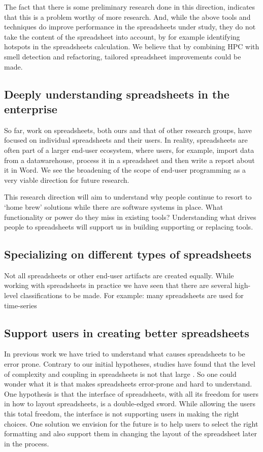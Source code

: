 \documentclass[conference]{IEEEtran}
\begin{document}
The fact that there is some preliminary research done in this direction, indicates that this is a problem worthy of more research. And, while the above tools and techniques do improve performance in the spreadsheets under study, they do not take the content of the spreadsheet into account, by for example identifying hotspots in the spreadsheets calculation. We believe that by combining HPC with smell detection and refactoring, tailored spreadsheet improvements could be made.

\subsection{Deeply understanding spreadsheets in the enterprise}
So far, work on spreadsheets, both ours and that of other research groups, have focused on individual spreadsheets and their users. In reality, spreadsheets are often part of a larger end-user ecosystem, where users, for example, import data from a datawarehouse, process it in a spreadsheet and then write a report about it in Word. We see the broadening of the scope of end-user programming as a very viable direction for future research. 

This research direction will aim to understand why people continue to resort to `home brew' solutions while there are software systems in place. What functionality or power do they miss in existing tools? Understanding what drives people to spreadsheets will support us in building supporting or replacing tools.

\subsection{Specializing on different types of spreadsheets}
Not all spreadsheets or other end-user artifacts are created equally. While working with spreadsheets in practice we have seen that there are several high-level classifications to be made. For example: many spreadsheets are used for time-series 

\subsection{Support users in creating better spreadsheets}
In previous work we have tried to understand what causes spreadsheets to be error prone. Contrary to our initial hypotheses, studies have found that the level of complexity and coupling in spreadsheets is not that large . So one could wonder what it is that makes spreadsheets error-prone and hard to understand. One hypothesis is that the interface of spreadsheets, with all its freedom for users in how to layout spreadsheets, is a double-edged sword. While allowing the users this total freedom, the interface is not supporting users in making the right choices. One solution we envision for the future is to help users to select the right formatting and also support them in changing the layout of the spreadsheet later in the process. 
\end{document}
